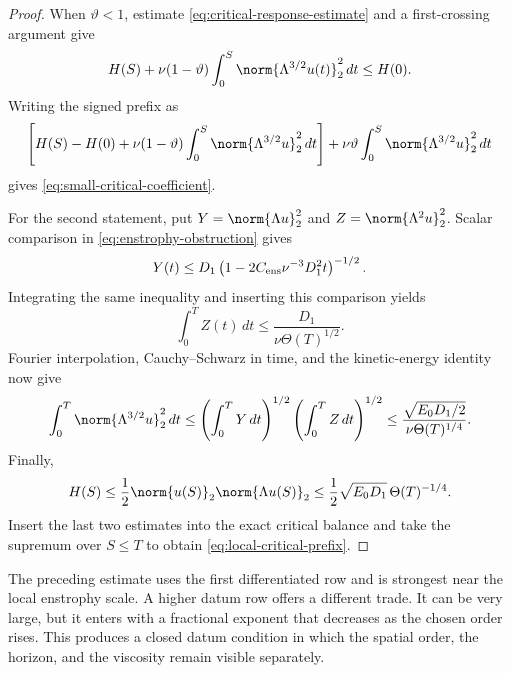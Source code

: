 \begin{proof}
When \(\vartheta<1\), estimate
\eqref{eq:critical-response-estimate} and a first-crossing argument give
\[
 H(S)+\nu(1-\vartheta)
 \int_0^S\norm{\Lambda^{3/2}u(t)}_2^2\,dt
 \le H(0).
\]
Writing the signed prefix as
\[
 \left[
 H(S)-H(0)+\nu(1-\vartheta)
 \int_0^S\norm{\Lambda^{3/2}u}_2^2\,dt
 \right]
 +\nu\vartheta
 \int_0^S\norm{\Lambda^{3/2}u}_2^2\,dt
\]
gives \eqref{eq:small-critical-coefficient}.

For the second statement, put
\(Y=\norm{\Lambda u}_2^2\) and
\(Z=\norm{\Lambda^2u}_2^2\).  Scalar comparison in
\eqref{eq:enstrophy-obstruction} gives
\[
 Y(t)\le D_1
 \left(1-2C_{\rm ens}\nu^{-3}D_1^2t\right)^{-1/2}.
\]
Integrating the same inequality and inserting this comparison yields
\[
 \int_0^T Z(t)\,dt
 \le\frac{D_1}{\nu\Theta(T)^{1/2}}.
\]
Fourier interpolation, Cauchy--Schwarz in time, and the kinetic-energy
identity now give
\[
 \int_0^T\norm{\Lambda^{3/2}u}_2^2\,dt
 \le
 \left(\int_0^T Y\,dt\right)^{1/2}
 \left(\int_0^T Z\,dt\right)^{1/2}
 \le\frac{\sqrt{E_0D_1/2}}{\nu\Theta(T)^{1/4}}.
\]
Finally,
\[
 H(S)\le\frac12\norm{u(S)}_2\norm{\Lambda u(S)}_2
 \le\frac12\sqrt{E_0D_1}\,\Theta(T)^{-1/4}.
\]
Insert the last two estimates into the exact critical balance and take the
supremum over \(S\le T\) to obtain \eqref{eq:local-critical-prefix}.
\end{proof}

The preceding estimate uses the first differentiated row and is strongest near
the local enstrophy scale.  A higher datum row offers a different trade.  It
can be very large, but it enters with a fractional exponent that decreases as
the chosen order rises.  This produces a closed datum condition in which the
spatial order, the horizon, and the viscosity remain visible separately.

